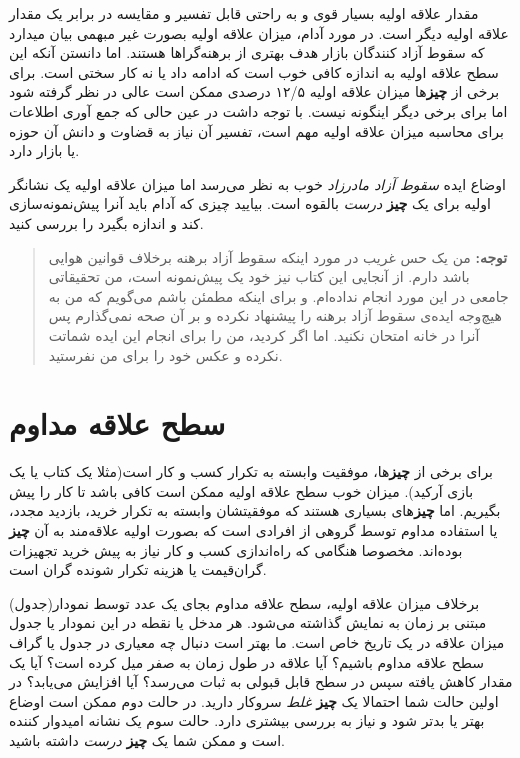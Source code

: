 مقدار علاقه اولیه بسیار قوی و به راحتی قابل تفسیر و مقایسه در برابر یک
مقدار علاقه اولیه دیگر است. در مورد آدام، میزان علاقه اولیه بصورت غیر
مبهمی بیان میدارد که سقوط آزاد کنندگان بازار هدف بهتری از برهنه‌گراها
هستند. اما دانستن آنکه این سطح علاقه اولیه به اندازه کافی خوب است که
ادامه داد یا نه کار سختی است. برای برخی از \textbf{چیز}ها میزان علاقه
اولیه ۱۲/۵ درصدی ممکن است عالی در نظر گرفته شود اما برای برخی دیگر
اینگونه نیست. با توجه داشت در عین حالی که جمع آوری اطلاعات برای محاسبه
میزان علاقه اولیه مهم است، تفسیر آن نیاز به قضاوت و دانش آن حوزه یا
بازار دارد.

اوضاع ایده \emph{سقوط آزاد مادرزاد} خوب به نظر می‌رسد اما میزان علاقه
اولیه یک نشانگر اولیه برای یک \textbf{چیز} \emph{درست} بالقوه است.
بیایید چیزی که آدام باید آنرا پیش‌نمونه‌سازی کند و اندازه بگیرد را بررسی
کنید.

\begin{quote}
\textbf{توجه:} من یک حس غریب در مورد اینکه سقوط آزاد برهنه برخلاف قوانین
هوایی باشد دارم. از آنجایی این کتاب نیز خود یک پیش‌نمونه است، من
تحقیقاتی جامعی در این مورد انجام نداده‌ام. و برای اینکه مطمئن باشم
می‌گویم که من به هیچ‌وجه ایده‌ی سقوط آزاد برهنه را پیشنهاد نکرده و بر آن
صحه نمی‌گذارم پس آنرا در خانه امتحان نکنید. اما اگر کردید، من را برای
انجام این ایده شماتت نکرده و عکس خود را برای من نفرستید.
\end{quote}

\section{سطح علاقه
مداوم}\label{ux633ux637ux62d-ux639ux644ux627ux642ux647-ux645ux62fux627ux648ux645}

برای برخی از \textbf{چیز}ها، موفقیت وابسته به تکرار کسب و کار است(مثلا
یک کتاب یا یک بازی آرکید). میزان خوب سطح علاقه اولیه ممکن است کافی باشد
تا کار را پیش بگیریم. اما \textbf{چیز}های بسیاری هستند که موفقیتشان
وابسته به تکرار خرید، بازدید مجدد، یا استفاده مداوم توسط گروهی از افرادی
است که بصورت اولیه علاقه‌مند به آن \textbf{چیز} بوده‌اند. مخصوصا هنگامی
که راه‌اندازی کسب و کار نیاز به پیش خرید تجهیزات گران‌قیمت یا هزینه
تکرار شونده گران است.

برخلاف میزان علاقه اولیه، سطح علاقه مداوم بجای یک عدد توسط نمودار(جدول)
مبتنی بر زمان به نمایش گذاشته می‌شود. هر مدخل یا نقطه در این نمودار یا
جدول میزان علاقه در یک تاریخ خاص است. ما بهتر است دنبال چه معیاری در
جدول یا گراف سطح علاقه مداوم باشیم؟ آیا علاقه در طول زمان به صفر میل
کرده است؟ آیا یک مقدار کاهش یافته سپس در سطح قابل قبولی به ثبات می‌رسد؟
آیا افزایش می‌یابد؟ در اولین حالت شما احتمالا یک \textbf{چیز} \emph{غلط}
سروکار دارید. در حالت دوم ممکن است اوضاع بهتر یا بدتر شود و نیاز به
بررسی بیشتری دارد. حالت سوم یک نشانه امیدوار کننده است و ممکن شما یک
\textbf{چیز} \emph{درست} داشته باشید.

